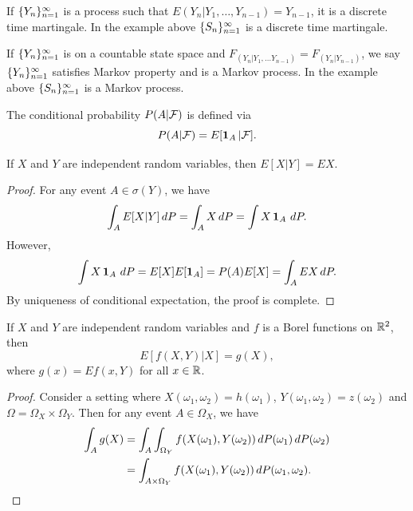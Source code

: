 \documentclass[a4paper]{article}
\begin{document}
\begin{remark}
  If $\{ Y_n \}_{n=1}^\infty$ is a process such that $E (Y_n | Y_1, \dots, 
  Y_{n - 1}) = Y_{n - 1}$, it is a discrete time martingale. 
  In the example above $\{ S_n \}_{n=1}^\infty$ is a discrete time martingale.
\end{remark}

\begin{remark}
  If $\{ Y_n \}_{n=1}^\infty$ is on a countable state space and 
  $F_{(Y_n | Y_1, \dots Y_{n - 1})} = F_{(Y_n | Y_{n - 1})}$,
  we say $\{ Y_n \}_{n=1}^\infty$ satisfies Markov property and is a Markov process. 
  In the example above $\{ S_n \}_{n=1}^\infty$ is a Markov process.
\end{remark}

\begin{defi}
  The conditional probability $P(A | \mathcal{F})$ is defined via 
  \[
  P (A | \mathcal{F}) = E [\operatorname{\mathbf{1}}_A | \mathcal{F}].
  \]
\end{defi}

\begin{prop}
  If $X$ and $Y$ are independent random variables, then 
  $E[X | Y] = E X$.
\end{prop}

\begin{proof}
  For any event $A \in \sigma (Y)$, we have 
  \begin{align*}
    \int_A E[X | Y] \, d P = \int_A X \, d P 
    = \int X \operatorname{\mathbf{1}}_A \, d P.
  \end{align*}
  However, 
  \[
  \int X \operatorname{\mathbf{1}}_A \, d P = E[X] E[\operatorname{\mathbf{1}}_A] = P(A) E[X] = \int_A E X \, d P.
  \]
  By uniqueness of conditional expectation, the proof is complete.

\end{proof}

\begin{prop}
  If $X$ and $Y$ are independent random variables 
  and $f$ is a Borel functions on $\mathbb{R}^2$,
  then 
  \[
  E [f(X, Y) | X] = g(X),
  \]
  where $g(x) = E f(x, Y)$ for all $x \in \mathbb{R}$.
\end{prop}

\begin{proof}
  Consider a setting where $X(\omega_1, \omega_2) = h(\omega_1)$,
  $Y(\omega_1, \omega_2) = z(\omega_2)$ and $\Omega = \Omega_X \times
  \Omega_Y$. Then for any event $A \in \Omega_X$, we have 
  \begin{align*}
    \int_A g(X) 
    &= \int_A \int_{\Omega_Y} 
    f(X(\omega_1), Y(\omega_2))  \, d P(\omega_1) \, d P(\omega_2) \\ 
    &= \int_{A \times \Omega_Y} f(X(\omega_1), Y(\omega_2)) 
    \, d P(\omega_1, \omega_2).
  \end{align*}
\end{proof}
\end{document}
